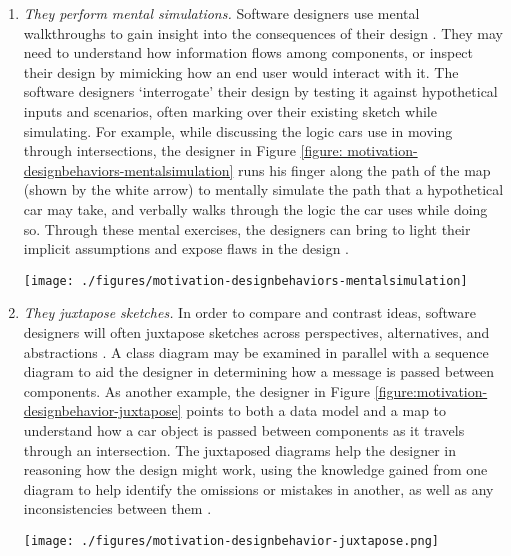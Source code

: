 \documentclass[12pt,fleqn]{ucithesis}
\begin{document}
\begin{enumerate}
 \item \emph{They perform mental simulations.} Software designers use mental walkthroughs to gain insight into the consequences of their design \cite{zannier2007model}. They may need to understand how information flows among components, or inspect their design by mimicking how an end user would interact with it. The software designers `interrogate' their design by testing it against hypothetical inputs and scenarios, often marking over their existing sketch while simulating. For example, while discussing the logic cars use in moving through intersections, the designer in Figure \ref{figure: motivation-designbehaviors-mentalsimulation} runs his finger along the path of the map (shown by the white arrow) to mentally simulate the path that a hypothetical car may take, and verbally walks through the logic the car uses while doing so. Through these mental exercises, the designers can bring to light their implicit assumptions and expose flaws in the design \cite{petre2009insights}. 


 
 \begin{figure*}[tbh]
  \centering
  \texttt{[image: ./figures/motivation-designbehaviors-mentalsimulation]}
  \caption{Designers sometimes use their sketches to mentally simulate their designs in use.}
  \label{figure: motivation-designbehaviors-mentalsimulation}
\end{figure*} 

 \item \emph{They juxtapose sketches.} In order to compare and contrast ideas, software designers will often juxtapose sketches across perspectives, alternatives, and abstractions \cite{petre2009insights}. A class diagram may be examined in parallel with a sequence diagram to aid the designer in determining how a message is passed between components. As another example, the designer in Figure \ref{figure:motivation-designbehavior-juxtapose} points to both a data model and a map to understand how a car object is passed between components as it travels through an intersection. The juxtaposed diagrams help the designer in reasoning how the design might work, using the knowledge gained from one diagram to help identify the omissions or mistakes in another, as well as any inconsistencies between them \cite{petre2009insights}. 

 
\begin{figure*}[tbh]
  \centering
  \texttt{[image: ./figures/motivation-designbehavior-juxtapose.png]}
  \caption{Designers juxtaposing two sketches by pointing.}
  \label{figure:motivation-designbehavior-juxtapose}
\end{figure*} 



\end{enumerate}
\end{document}

